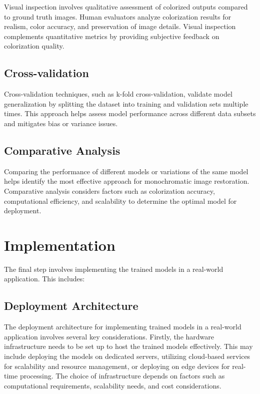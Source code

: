 Visual inspection involves qualitative assessment of colorized outputs compared to ground truth images. Human evaluators analyze colorization results for realism, color accuracy, and preservation of image details. Visual inspection complements quantitative metrics by providing subjective feedback on colorization quality.

\subsection{Cross-validation}

Cross-validation techniques, such as k-fold cross-validation, validate model generalization by splitting the dataset into training and validation sets multiple times. This approach helps assess model performance across different data subsets and mitigates bias or variance issues.

\subsection{Comparative Analysis}

Comparing the performance of different models or variations of the same model helps identify the most effective approach for monochromatic image restoration. Comparative analysis considers factors such as colorization accuracy, computational efficiency, and scalability to determine the optimal model for deployment.

\section{Implementation}

The final step involves implementing the trained models in a real-world application. This includes:

\subsection{Deployment Architecture}

The deployment architecture for implementing trained models in a real-world application involves several key considerations. Firstly, the hardware infrastructure needs to be set up to host the trained models effectively. This may include deploying the models on dedicated servers, utilizing cloud-based services for scalability and resource management, or deploying on edge devices for real-time processing. The choice of infrastructure depends on factors such as computational requirements, scalability needs, and cost considerations.

